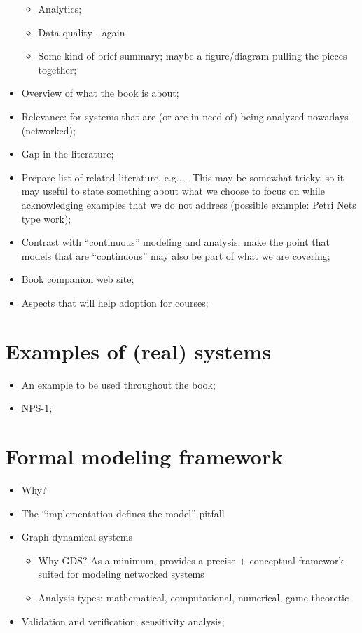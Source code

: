\documentclass[12pt]{book}
\begin{document}
\begin{itemize}
\begin{itemize}
  \item Analytics;
  \item Data quality - again
  \item Some kind of brief summary; maybe a figure/diagram pulling the pieces together;
  \end{itemize}
\item Overview of what the book is about;
\item Relevance: for systems that are (or are in need of) being
  analyzed nowadays (networked);
\item Gap in the literature;
\item Prepare list of related literature, e.g.,~\cite{Law:07}. This
  may be somewhat tricky, so it may useful to state something about
  what we choose to focus on while acknowledging examples that we do
  not address (possible example: Petri Nets type work);
\item Contrast with ``continuous'' modeling and analysis; make the
  point that models that are ``continuous'' may also be part of what
  we are covering;
\item Book companion web site;
\item Aspects that will help adoption for courses;
\end{itemize}

\section{Examples of (real) systems}

\begin{itemize}
\item An example to be used throughout the book;
\item NPS-1;
\end{itemize}

\section{Formal modeling framework}

\begin{itemize}
\item Why?
\item The ``implementation defines the model'' pitfall
\item Graph dynamical systems
  \begin{itemize}
  \item Why GDS? As a minimum, provides a precise + conceptual
    framework suited for modeling networked systems
  \item Analysis types: mathematical, computational, numerical,
    game-theoretic
  \end{itemize}
\item Validation and verification; sensitivity analysis;
\end{itemize}
\end{document}
